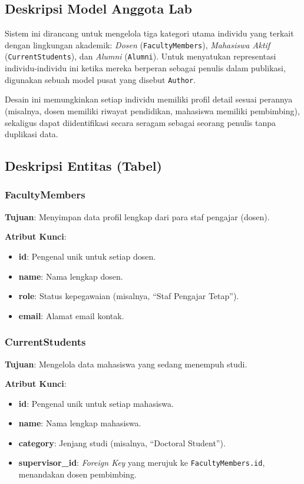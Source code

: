 \subsection{Deskripsi Model Anggota Lab}

Sistem ini dirancang untuk mengelola tiga kategori utama individu yang terkait dengan lingkungan akademik: 
\textit{Dosen} (\texttt{FacultyMembers}), \textit{Mahasiswa Aktif} (\texttt{CurrentStudents}), dan 
\textit{Alumni} (\texttt{Alumni}). Untuk menyatukan representasi individu-individu ini ketika mereka 
berperan sebagai penulis dalam publikasi, digunakan sebuah model pusat yang disebut \texttt{Author}.

Desain ini memungkinkan setiap individu memiliki profil detail sesuai perannya (misalnya, dosen memiliki 
riwayat pendidikan, mahasiswa memiliki pembimbing), sekaligus dapat diidentifikasi secara seragam sebagai 
seorang penulis tanpa duplikasi data.

\subsection{Deskripsi Entitas (Tabel)}

\subsubsection{FacultyMembers}
\textbf{Tujuan}: Menyimpan data profil lengkap dari para staf pengajar (dosen).

\textbf{Atribut Kunci}:
\begin{itemize}
    \item \textbf{id}: Pengenal unik untuk setiap dosen.
    \item \textbf{name}: Nama lengkap dosen.
    \item \textbf{role}: Status kepegawaian (misalnya, ``Staf Pengajar Tetap'').
    \item \textbf{email}: Alamat email kontak.
\end{itemize}

\subsubsection{CurrentStudents}
\textbf{Tujuan}: Mengelola data mahasiswa yang sedang menempuh studi.

\textbf{Atribut Kunci}:
\begin{itemize}
    \item \textbf{id}: Pengenal unik untuk setiap mahasiswa.
    \item \textbf{name}: Nama lengkap mahasiswa.
    \item \textbf{category}: Jenjang studi (misalnya, ``Doctoral Student'').
    \item \textbf{supervisor\_id}: \textit{Foreign Key} yang merujuk ke \texttt{FacultyMembers.id}, 
    menandakan dosen pembimbing.
\end{itemize}

